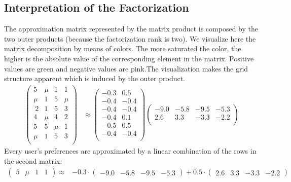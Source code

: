 \documentclass[letterpaper,10pt,english]{jupyterBook}
\begin{document}
\subsection{Interpretation of the Factorization}
\label{\detokenize{dim_reduction_mf:interpretation-of-the-factorization}}
\sphinxAtStartPar
The approximation matrix represented by the matrix product is composed by the two outer products (because the factorization rank is two). We visualize here the matrix decomposition by means of colors. The more saturated the color, the  higher is the absolute value of the corresponding element in the matrix. Positive values are green and negative values are pink.The visualization makes the grid structure apparent which is induced by the outer product.
\label{equation:dim_reduction_mf:10138930-0e45-4947-814c-1518463d4f46}\begin{align}
  \begin{pmatrix}
    5 & \mu & 1 & 1 \\
    \mu & 1 & 5 & \mu  \\\
    2 & 1 & 5 & 3 \\
    4 & \mu & 4 & 2\\
    5 & 5 & \mu & 1 \\
    \mu & 1 & 5 & 3 \\
  \end{pmatrix}
  &\approx
  \begin{pmatrix}
    -0.3 & 0.5\\
    -0.4 & -0.4\\
    -0.4 & -0.4\\
    -0.4 & 0.1\\
    -0.5 & 0.5\\
    -0.4 & -0.4\\
  \end{pmatrix}
  \begin{pmatrix}
    -9.0 & -5.8 & -9.5 & -5.3\\
    2.6 & 3.3 & -3.3 & -2.2\\
  \end{pmatrix}
\end{align}
\sphinxAtStartPar
Every user’s preferences are approximated by a linear combination of the rows in the second matrix:
\label{equation:dim_reduction_mf:e754d06b-0995-444e-8a3b-c3f8ec820c73}\begin{align}
    \begin{pmatrix}
        5 & \mu & 1 & 1 
    \end{pmatrix}
    \approx&
    -0.3\cdot 
    \begin{pmatrix}
        -9.0 & -5.8 & -9.5 & -5.3
    \end{pmatrix}
    +0.5\cdot
    \begin{pmatrix}
        2.6 & 3.3 & -3.3 & -2.2
    \end{pmatrix}    
\end{align}
\end{document}
